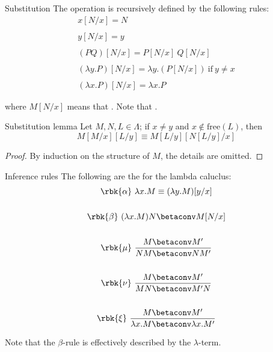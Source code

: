 \documentclass[a4paper, 12pt]{report}
\begin{document}
    \begin{frameddefn}{Substitution}
        The  operation is recursively defined by the following rules:
        \begin{gather*}
            x[N/x] = N \\ \\
            y[N/x] = y \\ \\
            (P Q)[N/x] = P[N/x] \ Q[N/x] \\ \\
            (\lambda y.P)[N/x] = \lambda y.(P[N/x]) \ \mathrm{if \ } y \neq x \\ \\
            (\lambda x.P)[N/x] = \lambda x.P
        \end{gather*}

        where $M[N/x]$ means that . Note that .
    \end{frameddefn}

    \begin{framedlem}{Substitution lemma}
        Let $M, N, L \in \Lambda$; if $x \neq y$ and $x \notin \mathrm{free}(L)$, then $$M[M/x][L/y] \equiv M[L/y][N[L/y]/x]$$
    \end{framedlem}

    \begin{proof}
        By induction on the structure of $M$, the details are omitted.
    \end{proof}

    \begin{frameddefn}[label={inf rules}]{Inference rules}
        The following are the  for the lambda caluclus:
        \begin{gather*}
            \rbk{\alpha} \ \lambda x.M \equiv (\lambda y.M)[y/x] \\ \\
            \rbk{\beta} \ (\lambda x.M)N \betaconv M[N/x] \\ \\
            \rbk{\mu} \ \dfrac{M \betaconv M'}{NM \betaconv NM'} \\ \\
            \rbk{\nu} \ \dfrac{M \betaconv M'}{MN \betaconv M'N} \\ \\
            \rbk{\xi} \ \dfrac{M \betaconv M'}{\lambda x.M \betaconv \lambda x.M'}
        \end{gather*}

        Note that the $\beta$-rule is effectively  described by the $\lambda$-term.
    \end{frameddefn}
\end{document}
